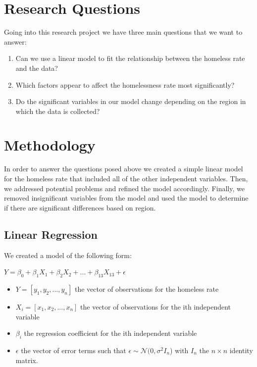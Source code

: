 \documentclass[12pt]{article}
\begin{document}
\section{Research Questions}

Going into this research project we have three main questions that we want to answer:
\begin{enumerate}
    \item Can we use a linear model to fit the relationship between the homeless rate and the data?
    
    \item Which factors appear to affect the homelessness rate most significantly?

    \item Do the significant variables in our model change depending on the region in which the data is collected?
    
\end{enumerate}


\section{Methodology}

In order to answer the questions posed above we created a simple linear model for the homeless rate that included all of the other independent variables. Then, we addressed potential problems and refined the model accordingly. Finally, we removed insignificant variables from the model and used the model to determine if there are significant differences based on region.


\subsection{Linear Regression}

We created a model of the following form:

$Y = \beta_{0} + \beta_{1}X_1 + \beta_{2}X_2 + ... + \beta_{13}X_{13} + \epsilon$


\begin{itemize}
    \item $Y = [y_1, y_2, ..., y_n]$ the vector of observations for the homeless rate

    \item $X_i = [x_1, x_2, ..., x_n]$ the vector of observations for the ith independent variable

    \item $\beta_i$ the regression coefficient for the ith independent variable

    \item $\epsilon$ the vector of error terms such that $\epsilon \sim \mathcal{N}(0, \sigma^2I_n$) with $I_n$ the $n\times n$ identity matrix.

\end{itemize}
\end{document}
